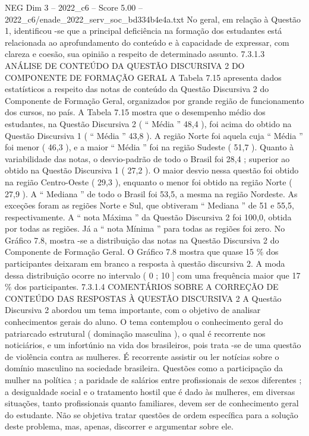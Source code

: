\begin{textsample}{NEG Dim 3 – 2022\_c6 – Score 5.00 – 2022\_c6/enade\_2022\_serv\_soc\_bd334b4e4a.txt}
No geral, em relação à Questão 1, identificou -se que a principal deficiência na formação dos estudantes está relacionada ao aprofundamento do conteúdo e à capacidade de expressar, com clareza e coesão, sua opinião a respeito de determinado assunto. 7.3.1.3 ANÁLISE DE CONTEÚDO DA QUESTÃO DISCURSIVA 2 DO COMPONENTE DE FORMAÇÃO GERAL A Tabela 7.15 apresenta dados estatísticos a respeito das notas de conteúdo da Questão Discursiva 2 do Componente de Formação Geral, organizados por grande região de funcionamento dos cursos, no país.
A Tabela 7.15 mostra que o desempenho médio dos estudantes, na Questão Discursiva 2 ( “ Média ” 48,4 ), foi acima do obtido na Questão Discursiva 1 ( “ Média ” 43,8 ).
A região Norte foi aquela cuja “ Média ” foi menor ( 46,3 ), e a maior “ Média ” foi na região Sudeste ( 51,7 ).
Quanto à variabilidade das notas, o desvio-padrão de todo o Brasil foi 28,4 ; superior ao obtido na Questão Discursiva 1 ( 27,2 ).
O maior desvio nessa questão foi obtido na região Centro-Oeste ( 29,3 ), enquanto o menor foi obtido na região Norte ( 27,9 ).
A “ Mediana ” de todo o Brasil foi 53,5, a mesma na região Nordeste.
As exceções foram as regiões Norte e Sul, que obtiveram “ Mediana ” de 51 e 55,5, respectivamente.
A “ nota Máxima ” da Questão Discursiva 2 foi 100,0, obtida por todas as regiões.
Já a “ nota Mínima ” para todas as regiões foi zero.
No Gráfico 7.8, mostra -se a distribuição das notas na Questão Discursiva 2 do Componente de Formação Geral.
O Gráfico 7.8 mostra que quase 15 \% dos participantes deixaram em branco a resposta à questão discursiva 2.
A moda dessa distribuição ocorre no intervalo ( 0 ; 10 ] com uma frequência maior que 17 \% dos participantes. 7.3.1.4 COMENTÁRIOS SOBRE A CORREÇÃO DE CONTEÚDO DAS RESPOSTAS À QUESTÃO DISCURSIVA 2 A Questão Discursiva 2 abordou um tema importante, com o objetivo de analisar conhecimentos gerais do aluno.
O tema contemplou o conhecimento geral do patriarcado estrutural ( dominação masculina ), o qual é recorrente nos noticiários, e um infortúnio na vida dos brasileiros, pois trata -se de uma questão de violência contra as mulheres.
É recorrente assistir ou ler notícias sobre o domínio masculino na sociedade brasileira.
Questões como a participação da mulher na política ; a paridade de salários entre profissionais de sexos diferentes ; a desigualdade social e o tratamento hostil que é dado às mulheres, em diversas situações, tanto profissionais quanto familiares, devem ser de conhecimento geral do estudante.
Não se objetiva tratar questões de ordem específica para a solução deste problema, mas, apenas, discorrer e argumentar sobre ele.

\end{textsample}
